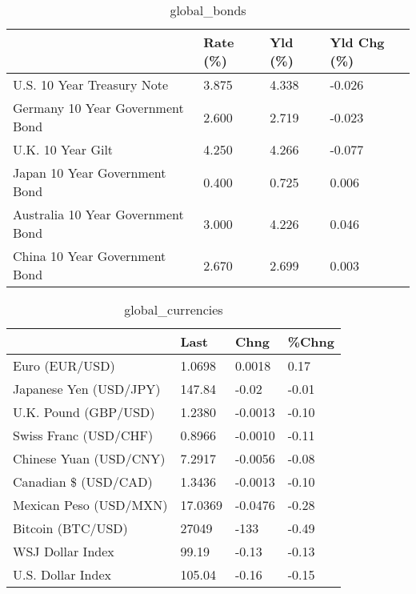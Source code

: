\documentclass{article}%
\begin{document}
%


\begin{table}[htbp]%
\caption{global\_bonds}%
\centering%
\begin{adjustbox}{width=1\textwidth}%
\begin{tabular}{llll}
\toprule
                                  & Rate (\%) & Yld (\%) & Yld Chg (\%) \\
\midrule
       U.S. 10 Year Treasury Note &    3.875 &   4.338 &      -0.026 \\
  Germany 10 Year Government Bond &    2.600 &   2.719 &      -0.023 \\
                U.K. 10 Year Gilt &    4.250 &   4.266 &      -0.077 \\
    Japan 10 Year Government Bond &    0.400 &   0.725 &       0.006 \\
Australia 10 Year Government Bond &    3.000 &   4.226 &       0.046 \\
    China 10 Year Government Bond &    2.670 &   2.699 &       0.003 \\
\bottomrule
\end{tabular}
%
\end{adjustbox}%
\end{table}

%


\begin{table}[htbp]%
\caption{global\_currencies}%
\centering%
\begin{adjustbox}{width=1\textwidth}%
\begin{tabular}{llll}
\toprule
                       &    Last &    Chng & \%Chng \\
\midrule
        Euro (EUR/USD) &  1.0698 &  0.0018 &  0.17 \\
Japanese Yen (USD/JPY) &  147.84 &   -0.02 & -0.01 \\
  U.K. Pound (GBP/USD) &  1.2380 & -0.0013 & -0.10 \\
 Swiss Franc (USD/CHF) &  0.8966 & -0.0010 & -0.11 \\
Chinese Yuan (USD/CNY) &  7.2917 & -0.0056 & -0.08 \\
  Canadian \$ (USD/CAD) &  1.3436 & -0.0013 & -0.10 \\
Mexican Peso (USD/MXN) & 17.0369 & -0.0476 & -0.28 \\
     Bitcoin (BTC/USD) &   27049 &    -133 & -0.49 \\
      WSJ Dollar Index &   99.19 &   -0.13 & -0.13 \\
     U.S. Dollar Index &  105.04 &   -0.16 & -0.15 \\
\bottomrule
\end{tabular}
%
\end{adjustbox}%
\end{table}
\end{document}
